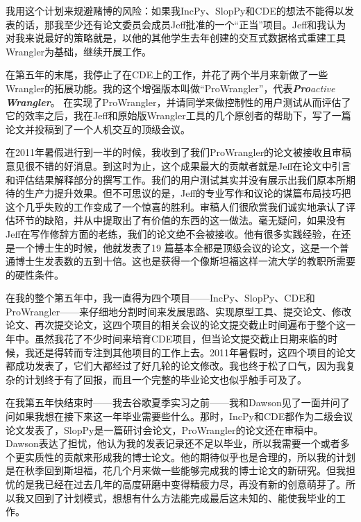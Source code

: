\documentclass[letter,12pt]{book}
\begin{document}
\begin{CJK}{UTF8}{gbsn}
我用这个计划来规避赌博的风险：如果我IncPy、SlopPy和CDE的想法不能得以发表的话，那我至少还有论文委员会成员Jeff批准的一个“正当”项目。Jeff和我认为对我来说最好的策略就是，以他的其他学生去年创建的交互式数据格式重建工具Wrangler为基础，继续开展工作。

在第五年的末尾，我停止了在CDE上的工作，并花了两个半月来新做了一些Wrangler的拓展功能。我的这个增强版本叫做“ProWrangler”，代表\emph{\textbf{Pro}active \textbf{Wrangler}}。 在实现了ProWrangler，并请同学来做控制性的用户测试从而评估了它的效率之后，我在Jeff和原始版Wrangler工具的几个原创者的帮助下，写了一篇论文并投稿到了一个人机交互的顶级会议。

在2011年暑假进行到一半的时候，我收到了我们ProWrangler的论文被接收且审稿意见很不错的好消息。到这时为止，这个成果最大的贡献者就是Jeff在论文中引言和评估结果解释部分的撰写工作。我们的用户测试其实并没有展示出我们原本所期待的生产力提升效果。但不可思议的是，Jeff的专业写作和议论的谋篇布局技巧把这个几乎失败的工作变成了一个惊喜的胜利。审稿人们很欣赏我们诚实地承认了评估环节的缺陷，并从中提取出了有价值的东西的这一做法。毫无疑问，如果没有Jeff在写作修辞方面的老练，我们的论文绝不会被接收。他有很多实践经验，在还是一个博士生的时候，他就发表了19 篇基本全都是顶级会议的论文，这是一个普通博士生发表数的五到十倍。这也是获得一个像斯坦福这样一流大学的教职所需要的硬性条件。

\breakline

在我的整个第五年中，我一直得为四个项目——IncPy、SlopPy、CDE和ProWrangler——来仔细地分割时间来发展思路、实现原型工具、提交论文、修改论文、再次提交论文，这四个项目的相关会议的论文提交截止时间遍布于整个这一年中。虽然我花了不少时间来培育CDE项目，但当论文提交截止日期来临的时候，我还是得转而专注到其他项目的工作上去。2011年暑假时，这四个项目的论文都成功发表了，它们大都经过了好几轮的论文修改。我也终于松了口气，因为我复杂的计划终于有了回报，而且一个完整的毕业论文也似乎触手可及了。


在我第五年快结束时——我去谷歌夏季实习之前——我和Dawson见了一面并问了问如果我想在接下来这一年毕业需要些什么。那时，IncPy和CDE都作为二级会议论文发表了，SlopPy是一篇研讨会论文，ProWrangler的论文还在审稿中。Dawson表达了担忧，他认为我的发表记录还不足以毕业，所以我需要一个或者多个更实质性的贡献来形成我的博士论文。他的期待似乎也是合理的，所以我的计划是在秋季回到斯坦福，花几个月来做一些能够完成我的博士论文的新研究。但我担忧的是我已经在过去几年的高度研磨中变得精疲力尽，再没有新的创意萌芽了。所以我又回到了计划模式，想想有什么方法能完成最后这未知的、能使我毕业的工作。


\end{CJK}
\end{document}

